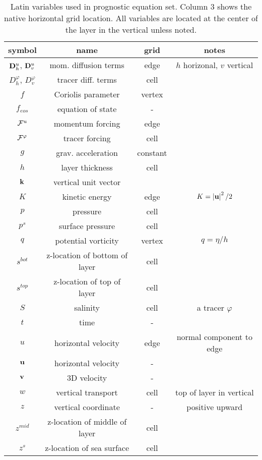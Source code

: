 \begin{table}[ht] 
\caption{Latin variables used in prognostic equation set.  Column 3 shows the native horizontal grid location.  All variables are located at the center of the layer in the vertical unless noted.} 
\vspace{0.5cm} \centering 
\begin{tabular}{c c c c } 
\hline\hline symbol &  name & grid &  notes  \\
\hline 
${\bf D}^u_h$, ${\bf D}^u_v$  & mom. diffusion terms & edge & $h$ horizonal, $v$ vertical\\ 
$ D^\varphi_h$, $ D^\varphi_v$ & tracer diff. terms & cell & \\ 
$f$ & Coriolis parameter & vertex \\
$f_{eos}$ & equation of state & -  \\
$ {\cal F}^u$ & momentum forcing & edge & \\ 
$ {\cal F}^\varphi$ & tracer forcing & cell & \\ 
$g$ & grav. acceleration & constant  \\
$h$ & layer thickness & cell &\\
${\bf k}$ & vertical unit vector &  \\
$K$ &  kinetic energy & edge  & $K = \left| {\bf u} \right|^2 / 2$ \\
$p$ & pressure & cell \\
$p^s$ & surface pressure & cell \\ 
$q$ & potential vorticity & vertex & $q=\eta/h$ \\
$s^{bot}$ & z-location of bottom of layer & cell \\
$s^{top}$ & z-location of top of layer & cell \\
$S$ & salinity & cell &  a tracer $\varphi$  \\
$t$ & time & -  \\
$u$ & horizontal velocity & edge  & normal component to edge\\
${\bf u}$ & horizontal velocity   & - \\
${\bf v}$ & 3D velocity   & - \\
$w$ & vertical transport & cell  & top of layer in vertical \\
$z$ & vertical coordinate & - & positive upward \\
$z^{mid}$ & z-location of middle of layer & cell \\
$z^{s}$ & z-location of sea surface  & cell \\
\hline 
\end{tabular} \label{oceanTable:variables} 
\end{table}

